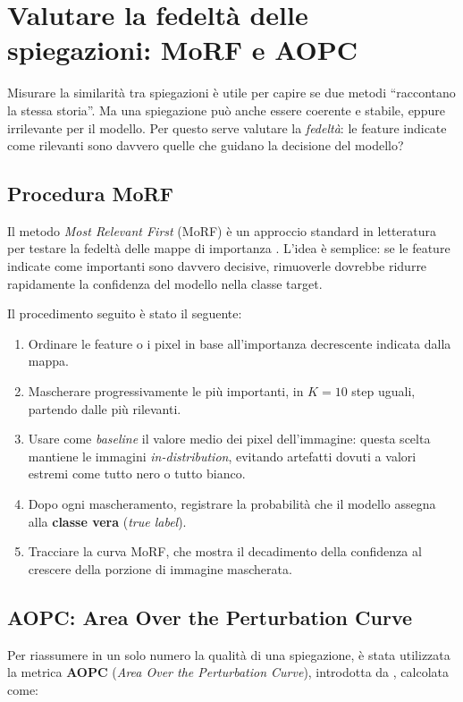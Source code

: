 \documentclass[12pt,a4paper,oneside]{report}
\numberwithin{figure}{chapter}
\numberwithin{table}{chapter}
\begin{document}
\chapter{Valutare la fedeltà delle spiegazioni: MoRF e AOPC}

Misurare la similarità tra spiegazioni è utile per capire se due metodi
``raccontano la stessa storia''. Ma una spiegazione può anche essere coerente e
stabile, eppure irrilevante per il modello. Per questo serve valutare la
\emph{fedeltà}: le feature indicate come rilevanti sono davvero quelle che
guidano la decisione del modello?

\section{Procedura MoRF}
Il metodo \emph{Most Relevant First} (MoRF) è un approccio standard in
letteratura per testare la fedeltà delle mappe di importanza
\citep{samek2016evaluating,samek2017explainable}. L’idea è semplice: se le
feature indicate come importanti sono davvero decisive, rimuoverle dovrebbe
ridurre rapidamente la confidenza del modello nella classe target.

Il procedimento seguito è stato il seguente:
\begin{enumerate}
      \item Ordinare le feature o i pixel in base all’importanza decrescente indicata dalla
            mappa.
      \item Mascherare progressivamente le più importanti, in $K=10$ step uguali, partendo
            dalle più rilevanti.
      \item Usare come \emph{baseline} il valore medio dei pixel dell’immagine: questa
            scelta mantiene le immagini \emph{in-distribution}, evitando artefatti dovuti a
            valori estremi come tutto nero o tutto bianco.
      \item Dopo ogni mascheramento, registrare la probabilità che il modello assegna alla
            \textbf{classe vera} (\textit{true label}).
      \item Tracciare la curva MoRF, che mostra il decadimento della confidenza al crescere
            della porzione di immagine mascherata.
\end{enumerate}

\section{AOPC: Area Over the Perturbation Curve}
Per riassumere in un solo numero la qualità di una spiegazione, è stata
utilizzata la metrica \textbf{AOPC} (\emph{Area Over the Perturbation Curve}),
introdotta da \citet{samek2016evaluating}, calcolata come:
\end{document}
